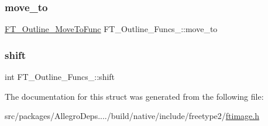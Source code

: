 \mbox{\label{struct_f_t___outline___funcs___abd53463a59a1ae2c6998e619c2ab6a65}} 
\subsubsection{\texorpdfstring{move\+\_\+to}{move\_to}}
{\footnotesize\ttfamily \hyperlink{ftimage_8h_adb1c27eedf361dcd3d331fa266a466af}{F\+T\+\_\+\+Outline\+\_\+\+Move\+To\+Func} F\+T\+\_\+\+Outline\+\_\+\+Funcs\+\_\+\+::move\+\_\+to}

\mbox{\label{struct_f_t___outline___funcs___a540c246669b21b86cb405b3d9019cfda}} 
\subsubsection{\texorpdfstring{shift}{shift}}
{\footnotesize\ttfamily int F\+T\+\_\+\+Outline\+\_\+\+Funcs\+\_\+\+::shift}



The documentation for this struct was generated from the following file\+:\begin{DoxyCompactItemize}
\item 
src/packages/\+Allegro\+Deps..../build/native/include/freetype2/\hyperlink{ftimage_8h}{ftimage.\+h}\end{DoxyCompactItemize}
